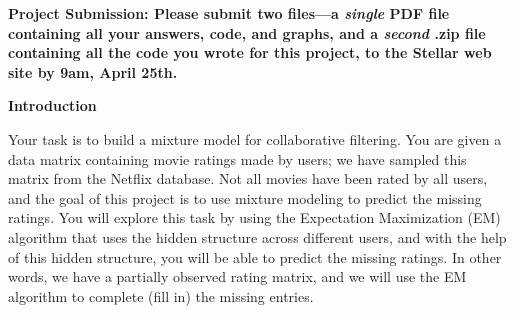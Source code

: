 

\usepackage[pdftex]{graphicx}
\usepackage{amsmath, amsthm, amssymb, amsfonts, mathtools, graphicx, enumerate}
\usepackage{times}
\usepackage{booktabs}
\usepackage{url}
\usepackage{enumerate}
\usepackage{enumitem}

\usepackage{xcolor}

\setlength{\parindent}{0pt}
\setlength{\parskip}{1ex}

\newcommand{\answer}[1]{{\mbox{}\color{red}{#1}}}
\newcommand{\emptycheck}{\text{(\hspace{-.75ex}(\hspace{3ex})\hspace{-.75ex})}}
\newcommand{\checkans}[1]{\text{(\hspace{-.75ex}(\hspace{1ex}{#1}\hspace{1ex})\hspace{-.75ex})}}
\newcommand{\argmax}{{\mbox{arg}\hspace{-.1ex}}\max}

\newcommand{\note}[1]{\textcolor{red}{#1}}




{\bf Project Submission: Please submit two files---a \emph{single} PDF file containing all your answers, code, and graphs, and a
\emph{second} .zip file containing all the code you wrote for this
project, to
the Stellar web site by 9am, April 25th.}

\textbf{Introduction}

Your task is to build a mixture model for collaborative filtering. You are given a data matrix containing movie ratings made by users; we have sampled this matrix from the Netflix database. Not all movies have been rated by all users, and the goal of this project is to use mixture modeling to predict the missing ratings. You will explore this task by using the Expectation Maximization (EM) algorithm that uses the hidden structure across different users, and with the help of this hidden structure, you will be able to predict the missing ratings. In other words, we have a partially observed rating matrix, and we will use the EM algorithm to complete (fill in) the missing entries.

